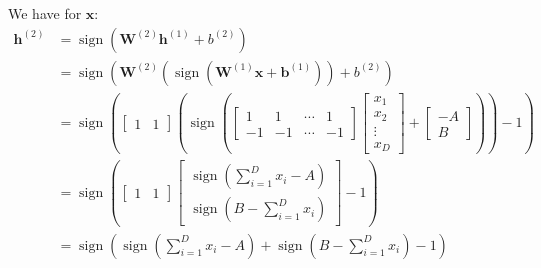 \documentclass[11pt]{article}
\DeclareMathOperator{\sign}{sign}
\begin{document}
We have for $\bm{x}$:
\begin{align*}
  \bm{h}^{(2)} &= \sign \left( \bm{W}^{(2)}\bm{h}^{(1)} + b^{(2)} \right) \\
               &= \sign \left( \bm{W}^{(2)} \left( \sign \left( \bm{W}^{(1)} \bm{x} + \bm{b}^{(1)} \right) \right) + b^{(2)} \right) \\
               &= \sign \left( \begin{bmatrix}
                                       1  &1
                                     \end{bmatrix} \left( \sign \left( \begin{bmatrix}
                                                                               1  &1  &\cdots &1 \\
                                                                               -1 &-1 &\cdots &-1
                                                                             \end{bmatrix}
                 \begin{bmatrix}
                   x_{1} \\
                   x_{2} \\
                   \vdots \\
                   x_{D}
                 \end{bmatrix} + \begin{bmatrix}
                                   -A \\
                                   B
                                 \end{bmatrix} \right) \right) -1 \right) \\
               &= \sign \left( \begin{bmatrix}
                                       1  &1
                                     \end{bmatrix} \begin{bmatrix}
                                                                               \sign \left( \sum_{i = 1}^{D} x_{i} - A \right) \\
                                                                               \sign \left( B - \sum_{i = 1}^{D} x_{i} \right)
                                                          \end{bmatrix} -1 \right) \\
               &= \sign \left( \sign \left( \sum_{i = 1}^{D} x_{i} - A \right) + \sign \left( B - \sum_{i = 1}^{D} x_{i} \right) -1 \right)
\end{align*}
\end{document}
